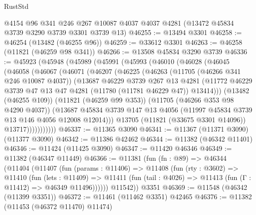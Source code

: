\begin{lexlean}{RustStd}
\begin{coremodule}
    @4154
    @96
    @341
    @246
    @267
    @10087
    @4037
    @4037
    @4281
    (@13472 @45834 @3739 @3290 @3739 @3301 @3739 @13)
@46255 := @13494 @3301
@46258 := @46254 (@13482 (@46255 @96))
@46259 := @33612 @3301
@46263 := @46258 (@11821 (@46259 @98 @341))
@46266 := @13508 @45834 @3290 @3739
@46336 := @45923
    (@45948
      (@45989
        (@45991
          (@45993
            (@46010
              (@46028
                (@46045
                  (@46058
                    (@46067
                      (@46071
                        (@46207
                          (@46225
                            (@46263
                              (@11705 (@46266 @341 @246 @10087 @4037))
                              (@13687
                                @46229
                                @3739
                                @267
                                @13
                                @4281
                                (@11772
                                  @46229
                                  @3739
                                  @47
                                  @13
                                  @47
                                  @4281
                                  (@11780 (@11781 @46229 @47))
                                  @13414)))
                            (@13482 (@46255 @109))
                            (@11821 (@46259 @99 @353))
                            (@11705 (@46266 @353 @98 @4290 @4037))
                            (@13687
                              @45834
                              @3739
                              @147
                              @13
                              @4056
                              (@11997 @45834 @3739 @13 @146 @4056 @12008 @12014)))
                          @13705
                          (@11821 (@33675 @3301 @14096))
                          @13717)))))))))))
@46337 := @11365 @3090
@46341 := @11367 (@11371 @3090) (@11377 @3090)
@46342 := @11386 @42462
@46344 := @11382 (@46342 @11401)
@46346 := @11424 (@11425 @3090)
@46347 := @11420 @46346
@46349 := @11382 (@46347 @11449)
@46366 := @11381
    (fun (fn : @89) =>
    @46344
      (@11404
        (@11407
          (fun (params : @11406) =>
          @11408
            (fun (rty : @3602) =>
            @11410
              (fun (lets : @11409) =>
              @11411 (fun (tail : @4026) => @11413 (fun (Γ : @11412) => @46349 @11496))))))
        @11542))
    @3351
@46369 := @11548 (@46342 (@11399 @3351))
@46372 := @11461 (@11462 @3351) @42465
@46376 := @11382 (@11453 (@46372 @11470) @11474)

\end{coremodule}
\end{lexlean}
